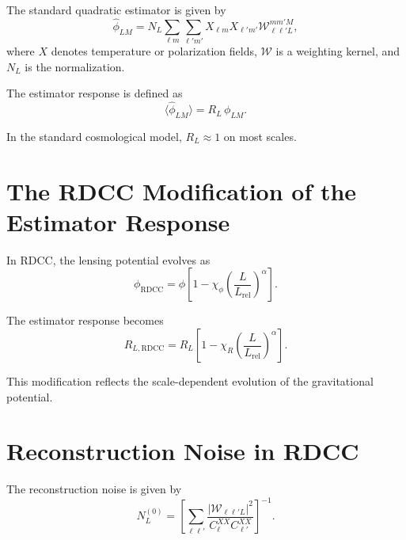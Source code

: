 \documentclass[11pt,a4paper]{article}
\begin{document}
The standard quadratic estimator is given by
\begin{equation}
    \hat{\phi}_{LM}
    = N_{L}
      \sum_{\ell m}
      \sum_{\ell' m'}
      X_{\ell m}
      X_{\ell' m'}
      \mathcal{W}_{\ell \ell' L}^{m m' M},
\end{equation}
where $X$ denotes temperature or polarization fields, $\mathcal{W}$ is a weighting 
kernel, and $N_{L}$ is the normalization.

The estimator response is defined as
\begin{equation}
    \langle \hat{\phi}_{LM} \rangle
    = R_{L}\, \phi_{LM}.
\end{equation}

In the standard cosmological model, $R_{L} \approx 1$ on most scales.
\section{The RDCC Modification of the Estimator Response}

In RDCC, the lensing potential evolves as
\begin{equation}
    \phi_{\mathrm{RDCC}}
    = \phi
      \left[
        1 - \chi_{\phi}
        \left(\frac{L}{L_{\mathrm{rel}}}\right)^{\alpha}
      \right].
\end{equation}

The estimator response becomes
\begin{equation}
    R_{L,\mathrm{RDCC}}
    = R_{L}
      \left[
        1 - \chi_{R}
        \left(\frac{L}{L_{\mathrm{rel}}}\right)^{\alpha}
      \right].
\end{equation}

This modification reflects the scale-dependent evolution of the gravitational 
potential.
\section{Reconstruction Noise in RDCC}

The reconstruction noise is given by
\begin{equation}
    N_{L}^{(0)}
    = \left[
        \sum_{\ell \ell'}
        \frac{
          \left|
            \mathcal{W}_{\ell \ell' L}
          \right|^{2}
        }{
          C_{\ell}^{XX}
          C_{\ell'}^{XX}
        }
      \right]^{-1}.
\end{equation}
\end{document}
